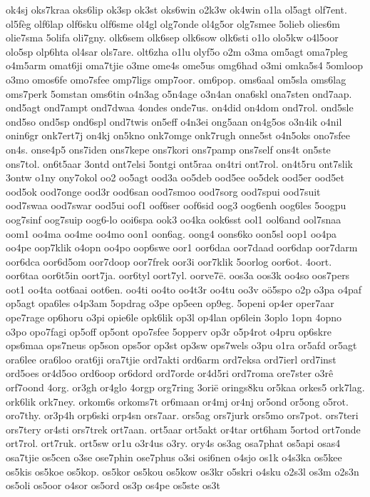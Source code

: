 {ok4sj
oks7kraa
oks6lip
ok3sp
ok3st
oks6win
o2k3w
ok4win
o1la
ol5agt
olf7ent.
ol5fèg
olf6lap
olf6sku
olf6sme
ol4gl
olg7onde
ol4g5or
olg7smee
5olieb
olies6m
olie7sma
5olifa
oli7gny.
olk6sem
olk6sep
olk6sow
olk6sti
o1lo
olo5kw
o4l5oor
olo5sp
olp6hta
ol4sar
ols7are.
olt6zha
o1lu
olyf5o
o2m
o3ma
om5agt
oma7pleg
o4m5arm
omat6ji
oma7tjie
o3me
ome4s
ome5us
omg6had
o3mi
omka5s4
5omloop
o3mo
omos6fe
omo7sfee
omp7ligs
omp7oor.
om6pop.
oms6aal
om5sla
oms6lag
oms7perk
5omstan
oms6tin
o4n3ag
o5n4age
o3n4an
ona6skl
ona7sten
ond7aap.
ond5agt
ond7ampt
ond7dwaa
4ondes
onde7us.
on4did
on4dom
ond7rol.
ond5sle
ond5so
ond5sp
ond6spl
ond7twis
on5eff
o4n3ei
ong5aan
on4g5os
o3n4ik
o4nil
onin6gr
onk7ert7j
on4kj
on5kno
onk7omge
onk7rugh
onne5st
o4n5oks
ono7sfee
on4s.
onse4p5
ons7iden
ons7kepe
ons7kori
ons7pamp
ons7self
ons4t
on5ste
ons7tol.
on6t5aar
3ontd
ont7elsi
5ontgi
ont5raa
on4tri
ont7rol.
on4t5ru
ont7slik
3ontw
o1ny
ony7okol
oo2
oo5agt
ood3a
oo5deb
ood5ee
oo5dek
ood5er
ood5et
ood5ok
ood7onge
ood3r
ood6san
ood7smoo
ood7sorg
ood7spui
ood7suit
ood7swaa
ood7swar
ood5ui
oof1
oof6ser
oof6sid
oog3
oog6enh
oog6les
5oogpu
oog7sinf
oog7suip
oog6-lo
ooi6spa
ook3
oo4ka
ook6sst
ool1
ool6and
ool7snaa
oom1
oo4ma
oo4me
oo4mo
oon1
oon6ag.
oong4
oons6ko
oon5sl
oop1
oo4pa
oo4pe
oop7klik
o4opn
oo4po
oop6swe
oor1
oor6daa
oor7daad
oor6dap
oor7darm
oor6dca
oor6d5om
oor7doop
oor7frek
oor3i
oor7klik
5oorlog
oor6ot.
4oort.
oor6taa
oor6t5in
oort7ja.
oor6tyl
oort7yl.
oorve7ë.
oos3a
oos3k
oo4so
oos7pers
oot1
oo4ta
oot6aai
oot6en.
oo4ti
oo4to
oo4t3r
oo4tu
oo3v
oö5spo
o2p
o3pa
o4paf
op5agt
opa6les
o4p3am
5opdrag
o3pe
op5een
op9eg.
5openi
op4er
oper7aar
ope7rage
op6horu
o3pi
opie6le
opk6lik
op3l
op4lan
op6lein
3oplo
1opn
4opno
o3po
opo7fagi
op5off
op5ont
opo7sfee
5opperv
op3r
o5p4rot
o4pru
op6skre
ops6maa
ops7neus
op5son
ops5or
op3st
op3sw
ops7wels
o3pu
o1ra
or5afd
or5agt
ora6lee
ora6loo
orat6ji
ora7tjie
ord7akti
ord6arm
ord7eksa
ord7ierl
ord7inst
ord5oes
or4d5oo
ord6oop
or6dord
ord7orde
or4d5ri
ord7roma
ore7ster
o3rê
orf7oond
4org.
or3gh
or4glo
4orgp
org7ring
3orië
orings8ku
or5kaa
orkes5
ork7lag.
ork6lik
ork7ney.
orkom6s
orkoms7t
or6maan
or4mj
or4nj
or5ond
or5ong
o5rot.
oro7thy.
or3p4h
orp6ski
orp4sn
ors7aar.
ors5ag
ors7jurk
ors5mo
ors7pot.
ors7teri
ors7tery
or4sti
ors7trek
ort7aan.
ort5aar
ort5akt
or4tar
ort6ham
5ortod
ort7onde
ort7rol.
ort7ruk.
ort5sw
or1u
o3r4us
o3ry.
ory4s
os3ag
osa7phat
os5api
osas4
osa7tjie
os5cen
o3se
ose7phin
ose7phus
o3si
osi6nen
o4sjo
os1k
o4s3ka
os5kee
os5kis
os5koe
os5kop.
os5kor
os5kou
os5kow
os3kr
o5skri
o4sku
o2s3l
os3m
o2s3n
os5oli
os5oor
o4sor
os5ord
os3p
os4pe
os5ste
os3t
}
